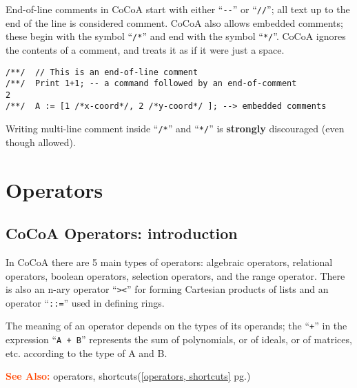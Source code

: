\documentclass[a4paper]{mybook}
\newcommand\SeeAlso{\par\textcolor{OrangeRed}{\textbf{\large See Also: }}}
\begin{document}
        
End-of-line comments in CoCoA start with either ``\verb&--&'' or
``\verb&//&''; all text up to the end of the line is considered comment.
CoCoA also allows embedded comments; these begin with the symbol
``\verb&/*&'' and end with the symbol ``\verb&*/&''.  CoCoA ignores the
contents of a comment, and treats it as if it were just a space.
\begin{Verbatim}[label=example, rulecolor=\color{PineGreen}, frame=single]
/**/  // This is an end-of-line comment
/**/  Print 1+1; -- a command followed by an end-of-comment
2
/**/  A := [1 /*x-coord*/, 2 /*y-coord*/ ]; --> embedded comments
\end{Verbatim}

\par 
Writing multi-line comment inside ``\verb&/*&'' and ``\verb&*/&''
is \textbf{strongly} discouraged (even though allowed).


\chapter{Operators}
\label{Operators}

      

\section{CoCoA Operators: introduction}
\label{CoCoA Operators: introduction}

        
In CoCoA there are 5 main types of operators: algebraic
operators, relational operators, boolean operators, selection
operators, and the range operator.
There is also an n-ary operator ``\verb&><&'' for forming
Cartesian products of lists and an operator ``\verb&::=&'' used in
defining rings.
\par 
The meaning of an operator depends on the types of its operands; the ``\verb&+&''
in the expression ``\verb&A + B&'' represents the sum of polynomials, or of
ideals, or of matrices, etc. according to the type of A and B.


















\SeeAlso %
  operators, shortcuts(\ref{operators, shortcuts} pg.\pageref{operators, shortcuts})
\end{document}
